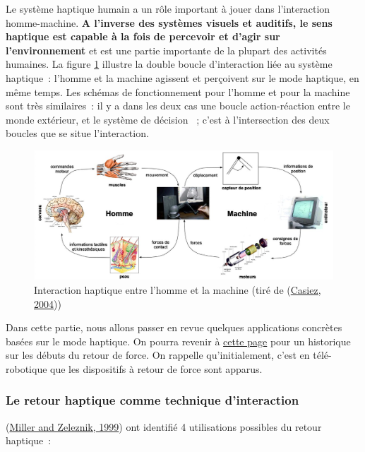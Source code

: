 \documentclass[
]{book}
\begin{document}
Le système haptique humain a un rôle important à jouer dans l'interaction
homme-machine. \textbf{A l'inverse des systèmes visuels et auditifs, le sens
haptique est capable à la fois de percevoir et d'agir sur l'environnement}
et est une partie importante de la plupart des activités humaines. La
figure \ref{fig:interactionhaptique} illustre la double boucle d'interaction
liée au système haptique~: l'homme et la machine agissent et perçoivent sur
le mode haptique, en même temps. Les schémas de fonctionnement pour l'homme
et pour la machine sont très similaires~: il y a dans les deux cas une boucle
action-réaction entre le monde extérieur, et le système de décision ~; c'est
à l'intersection des deux boucles que se situe l'interaction.

\begin{figure}
\centering
\includegraphics{img/retourhaptic.png}
\caption{\label{fig:interactionhaptique}Interaction haptique entre l'homme et la machine
(tiré de (\protect\hyperlink{ref-casiez2004contribution}{Casiez, 2004}))}
\end{figure}

Dans cette partie, nous allons passer en revue quelques applications
concrètes basées sur le mode haptique. On pourra revenir à
\protect\hyperlink{historique}{cette page} pour un historique sur les débuts du retour de
force. On rappelle qu'initialement, c'est en télé-robotique que les
dispositifs à retour de force sont apparus.

\hypertarget{le-retour-haptique-comme-technique-dinteraction}{%
\subsubsection{Le retour haptique comme technique d'interaction}\label{le-retour-haptique-comme-technique-dinteraction}}

(\protect\hyperlink{ref-miller1999design}{Miller and Zeleznik, 1999}) ont identifié 4 utilisations possibles du retour haptique~:
\end{document}

